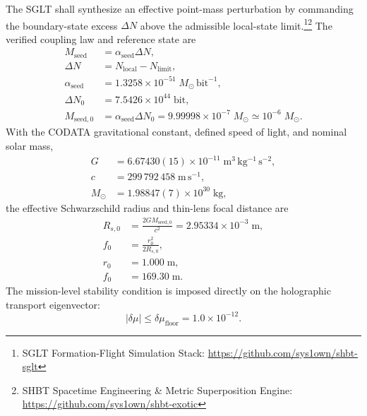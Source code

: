 \documentclass[10pt,twocolumn]{IEEEtran}
\newcommand{\Msun}{M_{\odot}}
\begin{document}
The SGLT shall synthesize an effective point-mass perturbation by commanding the boundary-state excess $\Delta N$ above the admissible local-state limit.\footnote{SGLT Formation-Flight Simulation Stack: \url{https://github.com/sys1own/shbt-sglt}}\footnote{SHBT Spacetime Engineering \& Metric Superposition Engine: \url{https://github.com/sys1own/shbt-exotic}} The verified coupling law and reference state are
\begin{equation}
\begin{aligned}
M_{\mathrm{seed}} &= \alpha_{\mathrm{seed}}\Delta N, \\
\Delta N &= N_{\mathrm{local}}-N_{\mathrm{limit}}, \\
\alpha_{\mathrm{seed}} &= 1.3258\times10^{-51}\;\Msun\,\mathrm{bit}^{-1}, \\
\Delta N_0 &= 7.5426\times10^{44}\;\mathrm{bit}, \\
M_{\mathrm{seed},0} &= \alpha_{\mathrm{seed}}\Delta N_0
=9.99998\times10^{-7}\;\Msun\simeq10^{-6}\;\Msun.
\end{aligned}
\label{eq:seed_law}
\end{equation}
With the CODATA gravitational constant, defined speed of light, and nominal solar mass,
\begin{equation}
\begin{aligned}
G &= 6.67430(15)\times10^{-11}\;\mathrm{m^3\,kg^{-1}\,s^{-2}}, \\
c &= 299\,792\,458\;\mathrm{m\,s^{-1}}, \\
\Msun &= 1.98847(7)\times10^{30}\;\mathrm{kg},
\end{aligned}
\label{eq:constants}
\end{equation}
the effective Schwarzschild radius and thin-lens focal distance are
\begin{equation}
\begin{aligned}
R_{s,0} &= \frac{2GM_{\mathrm{seed},0}}{c^2}
          = 2.95334\times10^{-3}\;\mathrm{m}, \\
f_0 &= \frac{r_0^2}{2R_{s,0}}, \\
r_0 &= 1.000\;\mathrm{m}, \\
f_0 &= 169.30\;\mathrm{m}.
\end{aligned}
\label{eq:focal_baseline}
\end{equation}
The mission-level stability condition is imposed directly on the holographic transport eigenvector:
\begin{equation}
\left|\delta\mu\right| \leq \delta\mu_{\mathrm{floor}}
=1.0\times10^{-12}.
\label{eq:rigidity}
\end{equation}
\end{document}
